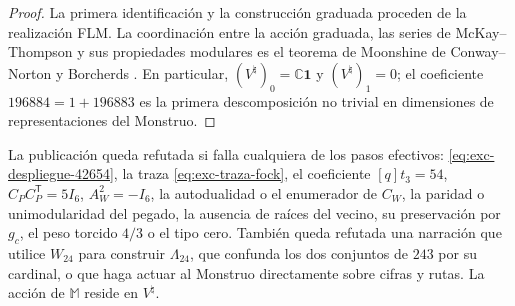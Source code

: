 \begin{proof}
La primera identificación y la construcción graduada proceden de la
realización FLM. La coordinación entre la acción graduada, las series de
McKay--Thompson y sus propiedades modulares es el teorema de Moonshine de
Conway--Norton y Borcherds
\citep{FLM1988,ConwayNorton1979,Borcherds1992}. En particular,
\((V^\natural)_0=\mathbb C\mathbf1\) y
\((V^\natural)_1=0\); el coeficiente \(196884=1+196883\) es la primera
descomposición no trivial en dimensiones de representaciones del Monstruo.
\end{proof}

\begin{falsifier}
\label{fals:exc-corredor}
La publicación queda refutada si falla cualquiera de los pasos efectivos:
\eqref{eq:exc-despliegue-42654}, la traza
\eqref{eq:exc-traza-fock}, el coeficiente \([q]t_3=54\),
\(C_PC_P^{\mathsf T}=5I_6\), \(A_W^2=-I_6\), la autodualidad o el
enumerador de \(C_W\), la paridad o unimodularidad del pegado, la ausencia
de raíces del vecino, su preservación por \(g_c\), el peso torcido
\(4/3\) o el tipo cero. También queda refutada una narración que utilice
\(W_{24}\) para construir \(\Lambda_{24}\), que confunda los dos conjuntos
de \(243\) por su cardinal, o que haga actuar al Monstruo directamente
sobre cifras y rutas. La acción de \(\mathbb M\) reside en \(V^\natural\).
\end{falsifier}
